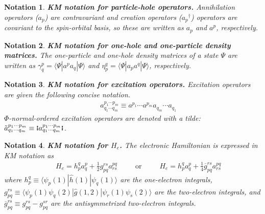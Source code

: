 \documentclass[11pt,fleqn]{article}
\newcommand{\g}{\gamma}      %
\newcommand{\h}{\eta}        %
\newcommand{\y}{\psi}        %
\newcommand{\Y}{\Psi}        %
\newcommand{\dg}{\ensuremath{^\dagger}}
\newcommand{\tl}{\ensuremath{\tilde}}
\newcommand{\ol}[1]{\ensuremath{\overline{#1}}}
\newcommand{\op}[1]{\ensuremath{\hat{#1}}}
\renewcommand{\sp}{\hspace{30pt}}
\newcommand{\cd}{\ensuremath{\cdots}}
\newcommand{\bmit}[1]{{\bfseries\itshape\mathversion{bold}#1}}
\newcommand{\ip}[1]{\ensuremath{\langle#1\rangle}}
\newcommand{\GNO}[1]{\setstackgap{S}{0.7pt}\ensuremath{\Shortstack{\textbf{.} \textbf{.} \textbf{.}}#1\Shortstack{\textbf{.} \textbf{.} \textbf{.}}}}
\theoremstyle{mystyle}
\newtheorem{ntt}{Notation}[section]
\numberwithin{equation}{section}
\begin{document}
\begin{ntt}
\bmit{KM notation for particle-hole operators.}
Annihilation operators ($a_p$) are contravariant and creation operators ($a_p\dg$) operators are covariant to the spin-orbital basis, so these are written as $a_p$ and $a^p$, respectively.
\end{ntt}

\begin{ntt}
\bmit{KM notation for one-hole and one-particle density matrices.}
The one-particle and one-hole density matrices of a state $\Y$ are written as $\g_q^p=\ip{\Y|a^pa_q|\Y}$ and $\h_p^q=\ip{\Y|a_pa^q|\Y}$, respectively.
\end{ntt}

\begin{ntt}
\bmit{KM notation for excitation operators.}
Excitation operators are given the following concise notation.
\begin{align*}
&&
  a_{q_1\cd q_m}^{p_1\cd p_m}
\equiv
  a^{p_1}\cd a^{p_m}a_{q_m}\cd a_{q_1}
\end{align*}
$\Phi$-normal-ordered excitation operators are denoted with a tilde:
$
  \tl{a}_{q_1\cd q_m}^{p_1\cd p_m}
\equiv
  \GNO{a_{q_1\cd q_m}^{p_1\cd p_m}}
$.
\end{ntt}

\begin{ntt}
\bmit{KM notation for $H_e$.}
The electronic Hamiltonian is expressed in KM notation as
\begin{align*}
&&
  H_e
=
  h_p^q
  a_q^p
+
  \tfrac{1}{2}
  g_{pq}^{rs}
  a_{rs}^{pq}
\sp \text{or}\sp
  H_e
=
  h_p^q
  a_q^p
+
  \tfrac{1}{4}
  \ol{g}_{pq}^{rs}
  a_{rs}^{pq}
\end{align*}
where $h_p^q\equiv\ip{\y_p(1)|\op{h}(1)|\y_q(1)}$ are the one-electron integrals, 
$g_{pq}^{rs}\equiv\ip{\y_p(1)\y_q(2)|\op{g}(1,2)|\y_r(1)\y_s(2)}$
are the two-electron integrals, and $\ol{g}_{pq}^{rs}\equiv g_{pq}^{rs}-g_{pq}^{sr}$ are the antisymmetrized two-electron integrals.
\end{ntt}
\end{document}
